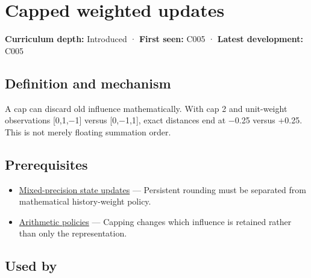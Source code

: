 \hypertarget{appendix-1e45d0613db3}{}\label{referencestart:appendix-1e45d0613db3}
\section{Capped weighted updates}\label{appendix-1e45d0613db3-capped-weighted-updates}

\hypertarget{appendix-1e45d0613db3-capped-weighted-updates}{}

\textbf{Curriculum depth:} Introduced · \textbf{First seen:} C005 · \textbf{Latest development:} C005

\begin{allmightroledefinition}

\subsection{Definition and mechanism}\label{appendix-1e45d0613db3-definition-and-mechanism}

\hypertarget{appendix-1e45d0613db3-definition-and-mechanism}{}

A cap can discard old influence mathematically. With cap 2 and unit-weight observations {[}0,1,−1{]} versus {[}0,−1,1{]}, exact distances end at −0.25 versus +0.25. This is not merely floating summation order.

\end{allmightroledefinition}

\subsection{Prerequisites}\label{appendix-1e45d0613db3-prerequisites}

\hypertarget{appendix-1e45d0613db3-prerequisites}{}

\begin{itemize}
\tightlist
\item
  \hyperref[appendix-260182e617b7]{Mixed-precision state updates} --- Persistent rounding must be separated from mathematical history-weight policy.
\item
  \hyperref[appendix-2ed044358b82]{Arithmetic policies} --- Capping changes which influence is retained rather than only the representation.
\end{itemize}

\subsection{Used by}\label{appendix-1e45d0613db3-used-by}

